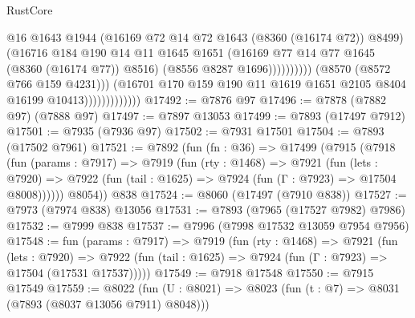 \begin{lexlean}{RustCore}
\begin{coremodule}
                                              @16
                                              @1643
                                              @1944
                                              (@16169 @72 @14 @72 @1643 (@8360 (@16174 @72)) @8499)
                                              (@16716
                                                @184
                                                @190
                                                @14
                                                @11
                                                @1645
                                                @1651
                                                (@16169
                                                  @77
                                                  @14
                                                  @77
                                                  @1645
                                                  (@8360 (@16174 @77))
                                                  @8516)
                                                (@8556 @8287 @1696))))))))))
                              (@8570 (@8572 @766 @159 @4231)))
                            (@16701
                              @170
                              @159
                              @190
                              @11
                              @1619
                              @1651
                              @2105
                              @8404
                              @16199
                              @10413)))))))))))))
@17492 := @7876 @97
@17496 := @7878 (@7882 @97) (@7888 @97)
@17497 := @7897 @13053
@17499 := @7893 (@17497 @7912)
@17501 := @7935 (@7936 @97)
@17502 := @7931 @17501
@17504 := @7893 (@17502 @7961)
@17521 := @7892
    (fun (fn : @36) =>
    @17499
      (@7915
        (@7918
          (fun (params : @7917) =>
          @7919
            (fun (rty : @1468) =>
            @7921
              (fun (lets : @7920) =>
              @7922 (fun (tail : @1625) => @7924 (fun (Γ : @7923) => @17504 @8008))))))
        @8054))
    @838
@17524 := @8060 (@17497 (@7910 @838))
@17527 := @7973 (@7974 @838) @13056
@17531 := @7893 (@7965 (@17527 @7982) @7986)
@17532 := @7999 @838
@17537 := @7996 (@7998 @17532 @13059 @7954 @7956)
@17548 := fun (params : @7917) =>
  @7919
    (fun (rty : @1468) =>
    @7921
      (fun (lets : @7920) =>
      @7922 (fun (tail : @1625) => @7924 (fun (Γ : @7923) => @17504 (@17531 @17537)))))
@17549 := @7918 @17548
@17550 := @7915 @17549
@17559 := @8022
    (fun (U : @8021) => @8023 (fun (t : @7) => @8031 (@7893 (@8037 @13056 @7911) @8048)))

\end{coremodule}
\end{lexlean}
